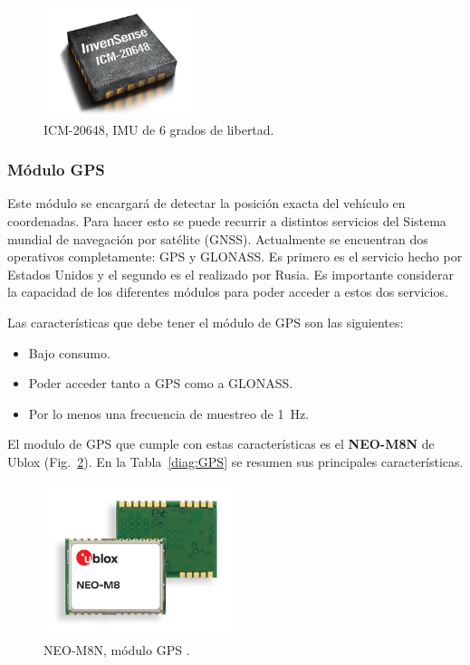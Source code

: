 \egroup

\begin{figure}[htb!]
\centering
\includegraphics[width=0.4\textwidth]{ICM-20648.png}
\caption{ICM-20648, IMU de 6 grados de libertad.}
\label{fig:IMU}
\end{figure}

\newpage

\subsubsection{Módulo GPS}
Este módulo se encargará de detectar la posición exacta del vehículo en coordenadas. Para hacer esto se puede recurrir a distintos servicios del Sistema mundial de navegación por satélite (GNSS). Actualmente se encuentran dos operativos completamente: GPS y GLONASS. Es primero es el servicio hecho por Estados Unidos y el segundo es el realizado por Rusia. Es importante considerar la capacidad de los diferentes módulos para poder acceder a estos dos servicios.

Las características que debe tener el módulo de GPS son las siguientes:
\begin{itemize}
    \itemsep0em
    \item Bajo consumo.
    \item Poder acceder tanto a GPS como a GLONASS.
    \item Por lo menos una frecuencia de muestreo de \SI{1}{Hz}.
\end{itemize}

El modulo de GPS que cumple con estas características es el \textbf{NEO-M8N} de Ublox (Fig.~\ref{fig:GPS}). En la Tabla~\ref{diag:GPS} se resumen sus principales características.
\begin{figure}[hbtp!]
\centering
\includegraphics[width=0.5\textwidth]{NEO-M8.png}
\caption[NEO-M8N, módulo GPS]{NEO-M8N, módulo GPS \cite{GPS}.}
\label{fig:GPS}
\end{figure}

